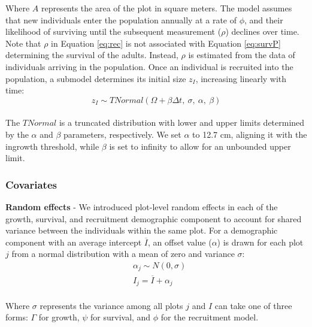 Where \(A\) represents the area of the plot in square meters. The model
assumes that new individuals enter the population annually at a rate of
\(\phi\), and their likelihood of surviving until the subsequent
measurement (\(\rho\)) declines over time. Note that \(\rho\) in
Equation \ref{eq:rec} is not associated with Equation \ref{eq:survP}
determining the survival of the adults. Instead, \(\rho\) is estimated
from the data of individuals arriving in the population. Once an
individual is recruited into the population, a submodel determines its
initial size \(z_I\), increasing linearly with time:\\

\begin{equation}
  z_{I} \sim TNormal(\Omega + \beta \Delta t,~\sigma, ~ \alpha, ~ \beta)
\label{eq:recSize}\end{equation}\\

The \(TNormal\) is a truncated distribution with lower and upper limits
determined by the \(\alpha\) and \(\beta\) parameters, respectively. We
set \(\alpha\) to 12.7 cm, aligning it with the ingrowth threshold,
while \(\beta\) is set to infinity to allow for an unbounded upper
limit.\\

\hypertarget{covariates}{%
\subsubsection{Covariates}\label{covariates}}

\textbf{Random effects} - We introduced plot-level random effects in
each of the growth, survival, and recruitment demographic component to
account for shared variance between the individuals within the same
plot. For a demographic component with an average intercept
\(\overline{I}\), an offset value (\(\alpha\)) is drawn for each plot
\(j\) from a normal distribution with a mean of zero and variance
\(\sigma\):\\

\begin{equation}
\begin{split}
&\alpha_{j} \sim N(0, \sigma) \\[2pt]
&I_j = \overline{I} + \alpha_j
\end{split}
\label{eq:randomEffect}\end{equation}\\

Where \(\sigma\) represents the variance among all plots \(j\) and \(I\)
can take one of three forms: \(\Gamma\) for growth, \(\psi\) for
survival, and \(\phi\) for the recruitment model.\\

